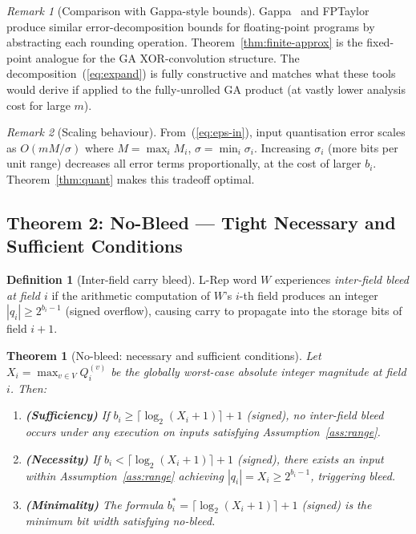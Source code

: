 \documentclass[11pt,a4paper]{article}
\theoremstyle{definition}
\newtheorem{definition}{Definition}[section]
\theoremstyle{plain}
\newtheorem{theorem}{Theorem}[section]
\theoremstyle{remark}
\newtheorem{remark}{Remark}[section]
\begin{document}
\begin{remark}[Comparison with Gappa-style bounds]
Gappa~\cite{gappa} and FPTaylor~\cite{fptaylor} produce similar
error-decomposition bounds for floating-point programs by abstracting
each rounding operation.
Theorem~\ref{thm:finite-approx} is the fixed-point analogue for the
GA XOR-convolution structure.
The decomposition~(\ref{eq:expand}) is fully constructive and matches
what these tools would derive if applied to the fully-unrolled GA
product (at vastly lower analysis cost for large $m$).
\end{remark}

\begin{remark}[Scaling behaviour]
From~(\ref{eq:eps-in}), input quantisation error scales as
$O(m M / \sigma)$ where $M = \max_i M_i$, $\sigma = \min_i \sigma_i$.
Increasing $\sigma_i$ (more bits per unit range) decreases all error
terms proportionally, at the cost of larger $b_i$.
Theorem~\ref{thm:quant} makes this tradeoff optimal.
\end{remark}

\subsection{Theorem 2: No-Bleed --- Tight Necessary and Sufficient Conditions}
\label{sec:nobleed}

\begin{definition}[Inter-field carry bleed]
L-Rep word $W$ experiences \emph{inter-field bleed at field $i$} if
the arithmetic computation of $W$'s $i$-th field produces an integer
$|q_i| \ge 2^{b_i - 1}$ (signed overflow), causing carry to
propagate into the storage bits of field $i+1$.
\end{definition}

\begin{theorem}[No-bleed: necessary and sufficient conditions]
\label{thm:nobleed}
Let $X_i = \max_{v \in V} Q_i^{(v)}$ be the globally worst-case
absolute integer magnitude at field $i$.
Then:
\begin{enumerate}
  \item \textbf{(Sufficiency)} If
        $b_i \ge \lceil \log_2(X_i + 1)\rceil + 1$
        (signed), no inter-field bleed occurs under any execution on
        inputs satisfying Assumption~\ref{ass:range}.
  \item \textbf{(Necessity)} If
        $b_i < \lceil \log_2(X_i + 1)\rceil + 1$
        (signed), there exists an input within Assumption~\ref{ass:range}
        achieving $|q_i| = X_i \ge 2^{b_i-1}$, triggering bleed.
  \item \textbf{(Minimality)} The formula
        $b_i^* = \lceil \log_2(X_i+1)\rceil + 1$
        (signed) is the minimum bit width satisfying no-bleed.
\end{enumerate}
\end{theorem}
\end{document}
